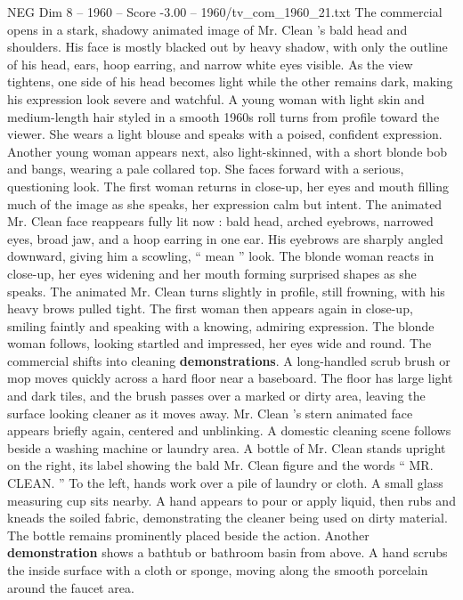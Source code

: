 \begin{textsample}{NEG Dim 8 – 1960 – Score -3.00 – 1960/tv\_com\_1960\_21.txt}  \label{ex:f8_neg_003}
The commercial opens in a stark, shadowy animated image of Mr.
Clean ’s bald head and shoulders.
His face is mostly blacked out by heavy shadow, with only the outline of his head, ears, hoop earring, and narrow white eyes visible.
As the view tightens, one side of his head becomes light while the other remains dark, making his expression look severe and watchful.
A young woman with light skin and medium-length hair styled in a smooth 1960s roll turns from profile toward the viewer.
She wears a light blouse and speaks with a poised, confident expression.
Another young woman appears next, also light-skinned, with a short blonde bob and bangs, wearing a pale collared top.
She faces forward with a serious, questioning look.
The first woman returns in close-up, her eyes and mouth filling much of the image as she speaks, her expression calm but intent.
The animated Mr.
Clean face reappears fully lit now : bald head, arched eyebrows, narrowed eyes, broad jaw, and a hoop earring in one ear.
His eyebrows are sharply angled downward, giving him a scowling, “ mean ” look.
The blonde woman reacts in close-up, her eyes widening and her mouth forming surprised shapes as she speaks.
The animated Mr.
Clean turns slightly in profile, still frowning, with his heavy brows pulled tight.
The first woman then appears again in close-up, smiling faintly and speaking with a knowing, admiring expression.
The blonde woman follows, looking startled and impressed, her eyes wide and round.
The commercial shifts into cleaning \textbf{demonstrations}.
A long-handled scrub brush or mop moves quickly across a hard floor near a baseboard.
The floor has large light and dark tiles, and the brush passes over a marked or dirty area, leaving the surface looking cleaner as it moves away.
Mr.
Clean ’s stern animated face appears briefly again, centered and unblinking.
A domestic cleaning scene follows beside a washing machine or laundry area.
A bottle of Mr.
Clean stands upright on the right, its label showing the bald Mr.
Clean figure and the words “ MR.
CLEAN. ” To the left, hands work over a pile of laundry or cloth.
A small glass measuring cup sits nearby.
A hand appears to pour or apply liquid, then rubs and kneads the soiled fabric, demonstrating the cleaner being used on dirty material.
The bottle remains prominently placed beside the action.
Another \textbf{demonstration} shows a bathtub or bathroom basin from above.
A hand scrubs the inside surface with a cloth or sponge, moving along the smooth porcelain around the faucet area.

\end{textsample}
